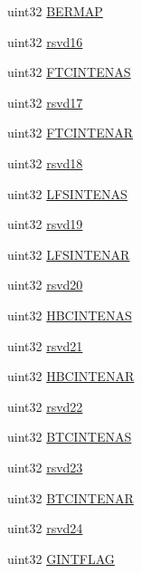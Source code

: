 \begin{DoxyCompactItemize}
\item 
uint32 \mbox{\hyperlink{structdmaBase_a0f2a81d7ffa07b100bd3581e43140e9d}{B\+E\+R\+M\+AP}}
\item 
uint32 \mbox{\hyperlink{structdmaBase_a4482dc09b387c6d1cf03777adeb81277}{rsvd16}}
\item 
uint32 \mbox{\hyperlink{structdmaBase_a1e56811bb3b610c905b05dc8227bb8fb}{F\+T\+C\+I\+N\+T\+E\+N\+AS}}
\item 
uint32 \mbox{\hyperlink{structdmaBase_ae76dfa76af1ce767d6ac8f7cbfc58bcc}{rsvd17}}
\item 
uint32 \mbox{\hyperlink{structdmaBase_afca6819e531e1b0e4195e83e97c87c46}{F\+T\+C\+I\+N\+T\+E\+N\+AR}}
\item 
uint32 \mbox{\hyperlink{structdmaBase_a0e5f84ff28e9b0c94238ef94b8548931}{rsvd18}}
\item 
uint32 \mbox{\hyperlink{structdmaBase_ab28a7d5016deac837dba7554fd0df31a}{L\+F\+S\+I\+N\+T\+E\+N\+AS}}
\item 
uint32 \mbox{\hyperlink{structdmaBase_a576e7c8d85f058420e3196fb330d0570}{rsvd19}}
\item 
uint32 \mbox{\hyperlink{structdmaBase_adee3b2a9653f23b78dc6f9788c410beb}{L\+F\+S\+I\+N\+T\+E\+N\+AR}}
\item 
uint32 \mbox{\hyperlink{structdmaBase_a9e2ca758193a091e78c9a0f21ef2e5a9}{rsvd20}}
\item 
uint32 \mbox{\hyperlink{structdmaBase_a54a3a136b7434241ecc1e85c08114549}{H\+B\+C\+I\+N\+T\+E\+N\+AS}}
\item 
uint32 \mbox{\hyperlink{structdmaBase_a4f8a53a8870c790e8fbab2c256ecdece}{rsvd21}}
\item 
uint32 \mbox{\hyperlink{structdmaBase_abce6e86c62b71c5a6c02cf6049a4e731}{H\+B\+C\+I\+N\+T\+E\+N\+AR}}
\item 
uint32 \mbox{\hyperlink{structdmaBase_aa6144648bb771618de3f7c1ae2fc96a8}{rsvd22}}
\item 
uint32 \mbox{\hyperlink{structdmaBase_a7ed84063fbf413b0f1d0dda2f46b35e7}{B\+T\+C\+I\+N\+T\+E\+N\+AS}}
\item 
uint32 \mbox{\hyperlink{structdmaBase_a1785a813fbc27812881a38c7fb2a19ce}{rsvd23}}
\item 
uint32 \mbox{\hyperlink{structdmaBase_ab87f2e3b856de6a3b75a7cacba574289}{B\+T\+C\+I\+N\+T\+E\+N\+AR}}
\item 
uint32 \mbox{\hyperlink{structdmaBase_ae4d738a44723feb837a0f8823e6ab98d}{rsvd24}}
\item 
uint32 \mbox{\hyperlink{structdmaBase_ab5acbfff366acf17abcd6e4efe06cd56}{G\+I\+N\+T\+F\+L\+AG}}

\end{DoxyCompactItemize}
